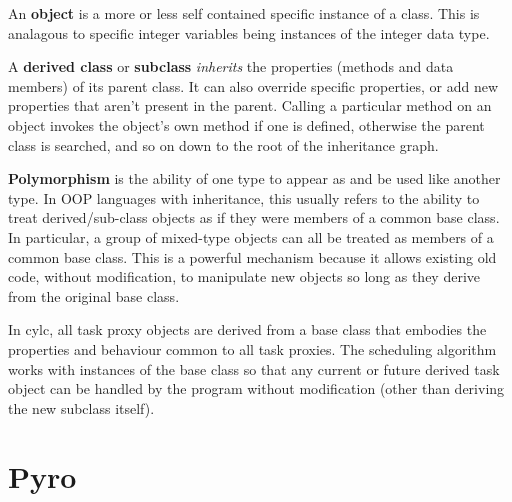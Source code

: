 \documentclass[11pt,a4paper]{article}
\begin{document}
An {\bf object} is a more or less self contained specific instance
of a class. This is analagous to specific integer variables being 
instances of the integer data type.

A {\bf derived class} or {\bf subclass} {\em inherits} the properties
(methods and data members) of its parent class. It can also override
specific properties, or add new properties that aren't present in the
parent. Calling a particular method on an object invokes the object's
own method if one is defined, otherwise the parent class is searched,
and so on down to the root of the inheritance graph. 



{\bf Polymorphism} is the ability of one type to appear as and be used
like another type.  In OOP languages with inheritance, this usually
refers to the ability to treat derived/sub-class objects as if they were
members of a common base class. In particular, a group of mixed-type
objects can all be treated as members of a common base class. 
This is a powerful mechanism because it allows existing old code,
without modification, to manipulate new objects so long as they 
derive from the original base class.

In cylc, all task proxy objects are derived from a base class that 
embodies the properties and behaviour common to all task proxies. 
The scheduling algorithm works with instances of the base class so that
any current or future derived task object can be handled by the program
without modification (other than deriving the new subclass itself).


\pagebreak
\section{Pyro} 
\label{Pyro}
\end{document}
